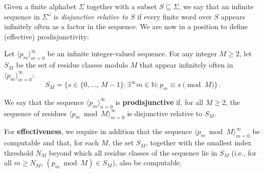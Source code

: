 \documentclass[a4paper,UKenglish,cleveref, autoref, thm-restate]{lipics-v2021}
\newcommand{\nat} {\mathbb{N}}
\begin{document}
Given a finite alphabet $\Sigma$ together with a subset
$S \subseteq \Sigma$, we say that an infinite sequence in
$\Sigma^{\omega}$ is \emph{disjunctive relative to $S$} if every
finite word over $S$ appears infinitely often as a factor in the
sequence. We are now in a position to define (effective)
prodisjunctivity:





\begin{definition}
\label{def : pronormal}
  Let $\langle p_m \rangle_{m=0}^{\infty}$ be an infinite integer-valued
  sequence. For any integer $M \geq 2$, let $S_M$ be the set of
  residue classes modulo $M$ that appear infinitely often in
  $\langle p_m \rangle_{m=0}^{\infty}$:
\begin{equation}\label{eq : definition S}
    S_M = \big\{s \in \{0,\dots, \, M-1\} \colon \exists^\infty m \in \nat
    \colon p_m \equiv s \!\!\! \pmod M \big\} \, .
\end{equation}

We say that the sequence $\langle p_m \rangle_{n=0}^{\infty}$ is
\textbf{prodisjunctive} if, for all $M \geq 2$, the sequence of
residues $\langle p_m\bmod M \rangle_{m=0}^{\infty}$ is
disjunctive relative to $S_M$.

For \textbf{effectiveness}, we require in addition that the sequence
$\langle p_m\bmod M \rangle_{m=0}^{\infty}$
be computable and that, for each $M$, the set $S_M$,
together with the smallest index threshold $N_M$ beyond which
all residue classes of the sequence lie in $S_M$ (i.e., for all
$m \geq N_M$, $(p_m\bmod M) \in S_M$), also be computable.
\end{definition}
\end{document}

